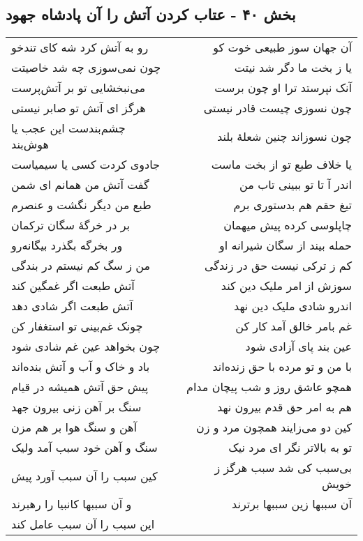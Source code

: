 \begin{center}
\section*{بخش ۴۰ - عتاب کردن آتش را آن پادشاه جهود}
\label{sec:sh040}
\begin{longtable}{l p{0.5cm} r}
رو به آتش کرد شه کای تندخو
&&
آن جهان سوز طبیعی خوت کو
\\
چون نمی‌سوزی چه شد خاصیتت
&&
یا ز بخت ما دگر شد نیتت
\\
می‌نبخشایی تو بر آتش‌پرست
&&
آنک نپرستد ترا او چون برست
\\
هرگز ای آتش تو صابر نیستی
&&
چون نسوزی چیست قادر نیستی
\\
چشم‌بندست این عجب یا هوش‌بند
&&
چون نسوزاند چنین شعلهٔ بلند
\\
جادوی کردت کسی یا سیمیاست
&&
یا خلاف طبع تو از بخت ماست
\\
گفت آتش من همانم ای شمن
&&
اندر آ تا تو ببینی تاب من
\\
طبع من دیگر نگشت و عنصرم
&&
تیغ حقم هم بدستوری برم
\\
بر در خرگهٔ سگان ترکمان
&&
چاپلوسی کرده پیش میهمان
\\
ور بخرگه بگذرد بیگانه‌رو
&&
حمله بیند از سگان شیرانه او
\\
من ز سگ کم نیستم در بندگی
&&
کم ز ترکی نیست حق در زندگی
\\
آتش طبعت اگر غمگین کند
&&
سوزش از امر ملیک دین کند
\\
آتش طبعت اگر شادی دهد
&&
اندرو شادی ملیک دین نهد
\\
چونک غم‌بینی تو استغفار کن
&&
غم بامر خالق آمد کار کن
\\
چون بخواهد عین غم شادی شود
&&
عین بند پای آزادی شود
\\
باد و خاک و آب و آتش بنده‌اند
&&
با من و تو مرده با حق زنده‌اند
\\
پیش حق آتش همیشه در قیام
&&
همچو عاشق روز و شب پیچان مدام
\\
سنگ بر آهن زنی بیرون جهد
&&
هم به امر حق قدم بیرون نهد
\\
آهن و سنگ هوا بر هم مزن
&&
کین دو می‌زایند همچون مرد و زن
\\
سنگ و آهن خود سبب آمد ولیک
&&
تو به بالاتر نگر ای مرد نیک
\\
کین سبب را آن سبب آورد پیش
&&
بی‌سبب کی شد سبب هرگز ز خویش
\\
و آن سببها کانبیا را رهبرند
&&
آن سببها زین سببها برترند
\\
این سبب را آن سبب عامل کند
&&

\end{longtable}
\end{center}

